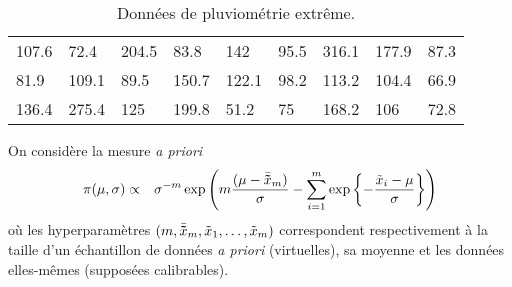 \documentclass[10pt]{article}
\newcommand{\1}{\mathbbm{1}}
\begin{document}
\begin{table}[h!]
\centering
\begin{tabular}{lllllllll}
\hline
107.6  &  72.4 &    204.5   &  83.8 &    142 &    95.5  &   316.1 &  177.9 &    87.3 \\
81.9   & 109.1 &   89.5      & 150.7  & 122.1 & 98.2      & 113.2    & 104.4  & 66.9  \\
136.4 & 275.4 & 125         & 199.8 & 51.2 &75     & 168.2    & 106       & 72.8 \\
\hline
\end{tabular}
\caption{Données de pluviométrie extrême.}
\label{data}
\end{table}


On considère la mesure {\it a priori}
\begin{eqnarray*}
\pi(\mu,\sigma) & \propto & \sigma^{-m}\exp\left(m\frac{(\mu-\bar{\bf\tilde{x}}_m)}{\sigma}-\sum\limits_{i=1}^{m} \exp\left\{-\frac{\tilde{x}_i-\mu}{\sigma}\right\}\right)
\end{eqnarray*} 
o\`u les hyperparam\`etres $(m,\bar{\bf\tilde{x}}_m,\tilde{x}_1,\ldots,\tilde{x}_m)$ correspondent respectivement \`a la taille d'un \'echantillon de donn\'ees {\it a priori} (virtuelles), sa moyenne et les donn\'ees elles-m\^emes (supposées calibrables). 
\end{document}
